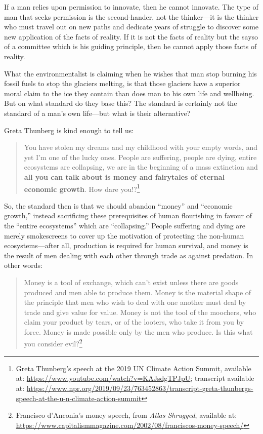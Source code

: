 \documentclass[11pt]{article}
\begin{document}
If a man relies upon permission to innovate, then he cannot innovate. The type of man that seeks permission is the second-hander, not the thinker---it is the thinker who must travel out on new paths and dedicate years of struggle to discover some new application of the facts of reality. If it is not the facts of reality but the sayso of a committee which is his guiding principle, then he cannot apply those facts of reality.

What the environmentalist is claiming when he wishes that man stop burning his fossil fuels to stop the glaciers melting, is that those glaciers have a superior moral claim to the ice they contain than does man to his own life and wellbeing. But on what standard do they base this? The standard is certainly not the standard of a man's own life---but what is their alternative?

Greta Thunberg is kind enough to tell us:
\begin{quote}
You have stolen my dreams and my childhood with your empty words, and yet I'm one of the lucky ones. People are suffering, people are dying, entire ecosystems are collapsing, we are in the beginning of a mass extinction and \textbf{all you can talk about is money and fairytales of eternal economic growth}. How dare you!?\footnote{Greta Thunberg's speech at the 2019 UN Climate Action Summit, available at: \url{https://www.youtube.com/watch?v=KAJsdgTPJpU}; transcript available at: \url{https://www.npr.org/2019/09/23/763452863/transcript-greta-thunbergs-speech-at-the-u-n-climate-action-summit}}
\end{quote}

So, the standard then is that we should abandon ``money'' and ``economic growth,'' instead sacrificing these prerequisites of human flourishing in favour of the ``entire ecosystems'' which are ``collapsing.'' People suffering and dying are merely smokescreens to cover up the motivation of protecting the non-human ecosystems---after all, production is required for human survival, and money is the result of men dealing with each other through trade as against predation. In other words:

\begin{quote}
Money is a tool of exchange, which can't exist unless there are goods produced and men able to produce them. Money is the material shape of the principle that men who wish to deal with one another must deal by trade and give value for value. Money is not the tool of the moochers, who claim your product by tears, or of the looters, who take it from you by force. Money is made possible only by the men who produce. Is this what you consider evil?\footnote{Francisco d'Anconia's money speech, from \emph{Atlas Shrugged}, available at: \url{https://www.capitalismmagazine.com/2002/08/franciscos-money-speech/}}
\end{quote}
\end{document}
